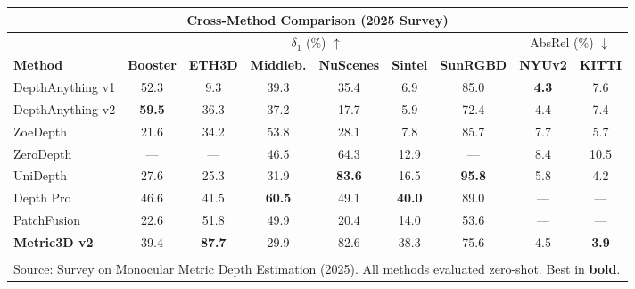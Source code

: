 \documentclass[border=10pt]{standalone}
\begin{document}
\begin{tabular}{@{} l c c c c c c c c @{}}
\toprule
\multicolumn{9}{c}{\textbf{\color{garnet}\textsf{\large Cross-Method Comparison (2025 Survey)}}} \\[4pt]
\midrule
& \multicolumn{6}{c}{\textsf{$\delta_1$ (\%) $\uparrow$}} & \multicolumn{2}{c}{\textsf{AbsRel (\%) $\downarrow$}} \\
\cmidrule(lr){2-7} \cmidrule(lr){8-9}
\textsf{\textbf{Method}} & \textsf{\textbf{Booster}} & \textsf{\textbf{ETH3D}} & \textsf{\textbf{Middleb.}} & \textsf{\textbf{NuScenes}} & \textsf{\textbf{Sintel}} & \textsf{\textbf{SunRGBD}} & \textsf{\textbf{NYUv2}} & \textsf{\textbf{KITTI}} \\
\midrule
\textsf{DepthAnything v1}   & 52.3 & 9.3  & 39.3 & 35.4 & 6.9  & 85.0 & \textbf{4.3}  & 7.6 \\
\textsf{DepthAnything v2}   & \textbf{59.5} & 36.3 & 37.2 & 17.7 & 5.9  & 72.4 & 4.4  & 7.4 \\
\textsf{ZoeDepth}           & 21.6 & 34.2 & 53.8 & 28.1 & 7.8  & 85.7 & 7.7  & 5.7 \\
\textsf{ZeroDepth}          & ---  & ---  & 46.5 & 64.3 & 12.9 & ---  & 8.4  & 10.5 \\
\textsf{UniDepth}           & 27.6 & 25.3 & 31.9 & \textbf{83.6} & 16.5 & \textbf{95.8} & 5.8  & 4.2 \\
\textsf{Depth Pro}          & 46.6 & 41.5 & \textbf{60.5} & 49.1 & \textbf{40.0} & 89.0 & ---  & --- \\
\textsf{PatchFusion}        & 22.6 & 51.8 & 49.9 & 20.4 & 14.0 & 53.6 & ---  & --- \\
\midrule
\rowcolor{highlight} \textsf{\textbf{Metric3D v2}} & 39.4 & \textbf{87.7} & 29.9 & 82.6 & 38.3 & 75.6 & 4.5 & \textbf{3.9} \\
\bottomrule
\\[-4pt]
\multicolumn{9}{l}{\scriptsize\textsf{Source: Survey on Monocular Metric Depth Estimation (2025). All methods evaluated zero-shot. Best in \textbf{bold}.}} \\
\end{tabular}
\end{document}
